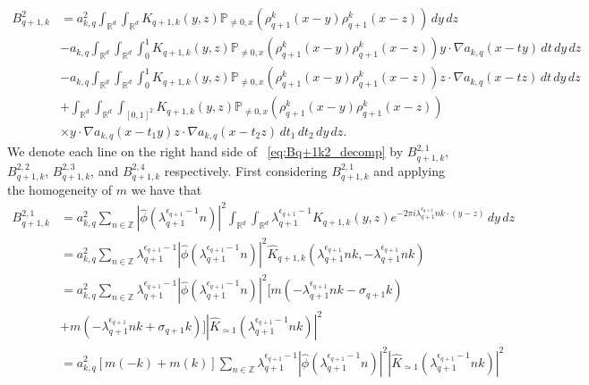 \documentclass[12pt,reqno,letterpaper]{amsart}
\numberwithin{equation}{section}
\newcommand{\1}{{\bf 1}}
\newcommand{\2}{{\bf 2}}
\newcommand{\R}{\mathbb R}
\newcommand{\Z}{\mathbb Z}
\theoremstyle{remark}
\theoremstyle{remark}
\begin{document}
\begin{equation}\label{eq:Bq+1k2_decomp}
    \begin{split}
        B_{q+1,k}^2 &= a_{k,q}^2 \int_{\R^d} \int_{\R^d} K_{q+1,k}(y,z) \mathbb{P}_{\not=0,x}\left(\rho_{q+1}^k(x-y) \rho_{q+1}^k(x-z)\right)\, dy\, dz\\
        &- a_{k,q} \int_{\R^d} \int_{\R^d} \int_0^1 K_{q+1,k}(y,z) \mathbb{P}_{\not=0,x}\left(\rho_{q+1}^k(x-y) \rho_{q+1}^k(x-z)\right) y \cdot \nabla a_{k,q}(x - ty) \, dt\, dy\, dz\\
        &- a_{k,q} \int_{\R^d} \int_{\R^d} \int_0^1 K_{q+1,k}(y,z) \mathbb{P}_{\not=0,x}\left(\rho_{q+1}^k(x-y) \rho_{q+1}^k(x-z)\right) z \cdot \nabla a_{k,q}(x - tz) \, dt\, dy\, dz\\
        &+ \int_{\R^d} \int_{\R^d} \int_{[0,1]^2} K_{q+1,k}(y,z) \mathbb{P}_{\not=0,x}\left(\rho_{q+1}^k(x-y) \rho_{q+1}^k(x-z)\right)\\
        &\times y\cdot \nabla a_{k,q}(x-t_1y) z \cdot \nabla a_{k,q}(x - t_2z) \, dt_1\, dt_2\, dy\, dz.
    \end{split}
\end{equation}
We denote each line on the right hand side of ~\eqref{eq:Bq+1k2_decomp} by $B_{q+1,k}^{2,1}$, $B_{q+1,k}^{2,2}$, $B_{q+1,k}^{2,3}$, and $B_{q+1,k}^{2,4}$ respectively. First considering $B_{q+1,k}^{2,1}$ and applying the homogeneity of $m$ we have that
\begin{equation}\label{eq:Bq+1k2,2_1}
    \begin{split}
        B_{q+1,k}^{2,1} &= a_{k,q}^2 \sum_{n \in \Z} \left|\hat{\phi}\left(\lambda_{q+1}^{\epsilon_{q+1}-1}n\right)\right|^2 \int_{\R^d} \int_{\R^d} \lambda_{q+1}^{\epsilon_{q+1}-1} K_{q+1,k}(y,z) e^{-2\pi i \lambda_{q+1}^{\epsilon_{q+1}} nk \cdot (y-z)}\, dy\, dz\\
        &= a_{k,q}^2 \sum_{n \in \Z} \lambda_{q+1}^{\epsilon_{q+1}-1} \left|\hat{\phi}\left(\lambda_{q+1}^{\epsilon_{q+1}-1}n\right)\right|^2 \hat{K}_{q+1,k}\left(\lambda_{q+1}^{\epsilon_{q+1}} nk, -\lambda_{q+1}^{\epsilon_{q+1}} nk\right)\\
        &= a_{k,q}^2 \sum_{n \in \Z} \lambda_{q+1}^{\epsilon_{q+1}-1} \left|\hat{\phi}\left(\lambda_{q+1}^{\epsilon_{q+1}-1}n\right)\right|^2 [m(-\lambda_{q+1}^{\epsilon_{q+1}} nk -\sigma_{q+1}k)\\
        &+ m(-\lambda_{q+1}^{\epsilon_{q+1}} nk +\sigma_{q+1}k)]\left|\hat{K}_{\simeq 1}\left(\lambda_{q+1}^{\epsilon_{q+1}-1}nk\right)\right|^2\\
        &= a_{k,q}^2 \left[m(-k) + m(k)\right] \sum_{n \in \Z} \lambda_{q+1}^{\epsilon_{q+1}-1} \left|\hat{\phi}\left(\lambda_{q+1}^{\epsilon_{q+1}-1}n\right)\right|^2 \left|\hat{K}_{\simeq 1}\left(\lambda_{q+1}^{\epsilon_{q+1}-1}nk\right)\right|^2
    \end{split}
\end{equation}
\end{document}

